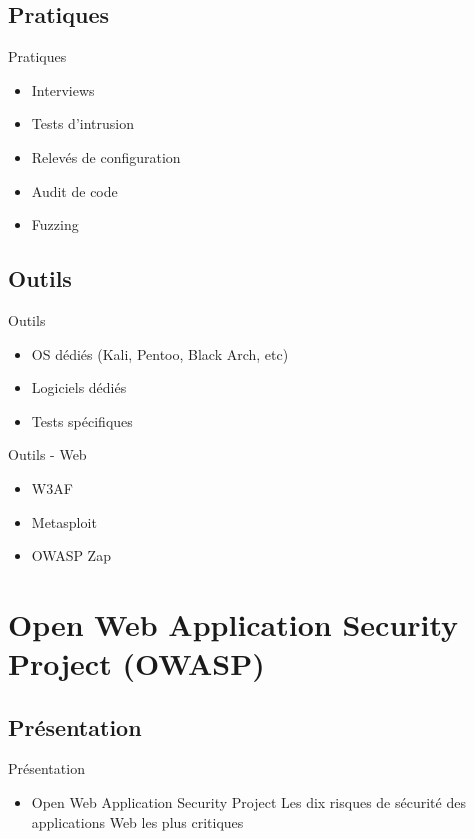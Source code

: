 \documentclass{beamer}
\begin{document}
	\subsection{Pratiques}
	\begin{frame}{Pratiques}
		\begin{itemize}
			\item Interviews
			\item Tests d'intrusion
			\item Relevés de configuration
			\item Audit de code
			\item Fuzzing
		\end{itemize}
	\end{frame}
	\subsection{Outils}
	\begin{frame}{Outils}
		\begin{itemize}
			\item OS dédiés (Kali, Pentoo, Black Arch, etc)
			\item Logiciels dédiés
			\item Tests spécifiques			
		\end{itemize}
	\end{frame}
	\begin{frame}{Outils - Web}
	\begin{itemize}
		\item W3AF
		\item Metasploit
		\item OWASP Zap			
	\end{itemize}
	\end{frame}

\section{Open Web Application Security Project (OWASP)}
	\subsection{Présentation}
	\begin{frame}{Présentation}
		\begin{itemize}
			\item Open Web Application Security Project
			\itemp Les dix risques de sécurité des applications Web les plus critiques		
		\end{itemize}
	\end{frame}
	
\end{document}
